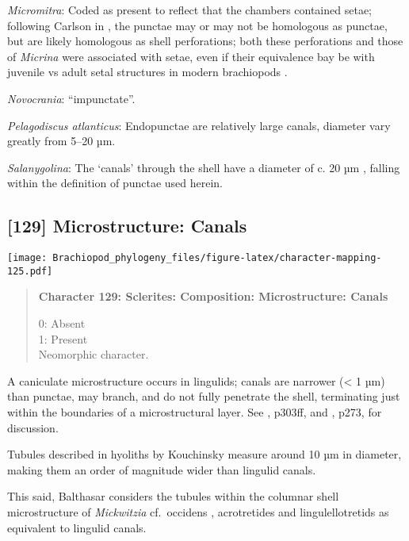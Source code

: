 \documentclass[openany]{book}
\theoremstyle{definition}
\theoremstyle{definition}
\theoremstyle{definition}
\theoremstyle{remark}
\begin{document}
\hypertarget{Micromitra-coding-128}{}
\emph{Micromitra}: Coded as present to reflect that the chambers
contained setae; following Carlson in \citet{Williams2007Supplement},
the punctae may or may not be homologous as punctae, but are likely
homologous as shell perforations; both these perforations and those of
\emph{Micrina} were associated with setae, even if their equivalence bay
be with juvenile vs adult setal structures in modern brachiopods
\citep[p.~397]{Balthasar2004Shellstructure}.

\hypertarget{Novocrania-coding-128}{}
\emph{Novocrania}: ``impunctate''.

\hypertarget{Pelagodiscus_atlanticus-coding-128}{}
\emph{Pelagodiscus atlanticus}: Endopunctae are relatively large canals,
diameter vary greatly from 5--20 µm.

\hypertarget{Salanygolina-coding-128}{}
\emph{Salanygolina}: The `canals' through the shell have a diameter of
c. 20 µm \citep[text-fig. 2a]{Williams2004Chemicostructure}, falling
within the definition of punctae used herein.

\subsection*{{[}129{]} Microstructure:
Canals}\label{microstructure-canals}

\texttt{[image: Brachiopod\_phylogeny\_files/figure-latex/character-mapping-125.pdf]}

\begin{quote}
\textbf{Character 129: Sclerites: Composition: Microstructure: Canals}

0: Absent\\
1: Present\\
Neomorphic character.
\end{quote}

A caniculate microstructure occurs in lingulids; canals are narrower
(\textless{} 1 µm) than punctae, may branch, and do not fully penetrate
the shell, terminating just within the boundaries of a microstructural
layer. See \citet{Williams1997Introduction}, p303ff, and
\citet{Balthasar2008iMummpikia}, p273, for discussion.

Tubules described in hyoliths by Kouchinsky
\citeyearpar{Kouchinsky2000Skeletalmicrostructures} measure around 10 µm
in diameter, making them an order of magnitude wider than lingulid
canals.

This said, Balthasar \citeyearpar{Balthasar2008iMummpikia} considers the
tubules within the columnar shell microstructure of \emph{Mickwitzia}
cf.~occidens \citep[1--3 µm wide,][]{Skovsted2003EarlyCambrian},
acrotretides \citep[1 µm wide,
see][\citet{Zhang2016Epithelialcell}]{Holmer1989MiddleOrdovician} and
lingulellotretids \citep[100 nm wide,][]{Cusack1999Chemicostructural} as
equivalent to lingulid canals.
\end{document}
